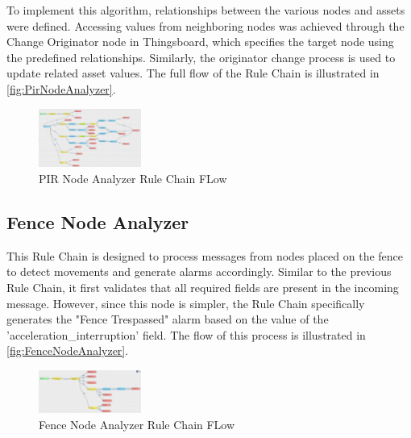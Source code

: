 To implement this algorithm, relationships between the various nodes and assets were defined. Accessing values from neighboring nodes was achieved through the Change
Originator node in Thingsboard, which specifies the target node using the predefined relationships. Similarly, the originator change process is used to update related 
asset values. The full flow of the Rule Chain is illustrated in \autoref{fig:PirNodeAnalyzer}.

\begin{figure}[H]
    \centering
    \includegraphics[width=0.3\textwidth]{./images/8/PirNodeAnalyzer.PNG}
    \caption{PIR Node Analyzer Rule Chain FLow}
    \label{fig:PirNodeAnalyzer}
\end{figure}

\subsection{Fence Node Analyzer}
This Rule Chain is designed to process messages from nodes placed on the fence to detect movements and generate alarms accordingly.  
Similar to the previous Rule Chain, it first validates that all required fields are present in the incoming message. However, since this node is simpler, the Rule 
Chain specifically generates the "Fence Trespassed" alarm based on the value of the 'acceleration_interruption' field. The flow of this process is illustrated in \autoref{fig:FenceNodeAnalyzer}.

\begin{figure}[H]
    \centering
    \includegraphics[width=0.3\textwidth]{./images/8/FenceNodeAnalyzer.PNG}
    \caption{Fence Node Analyzer Rule Chain FLow}
    \label{fig:FenceNodeAnalyzer}
\end{figure}